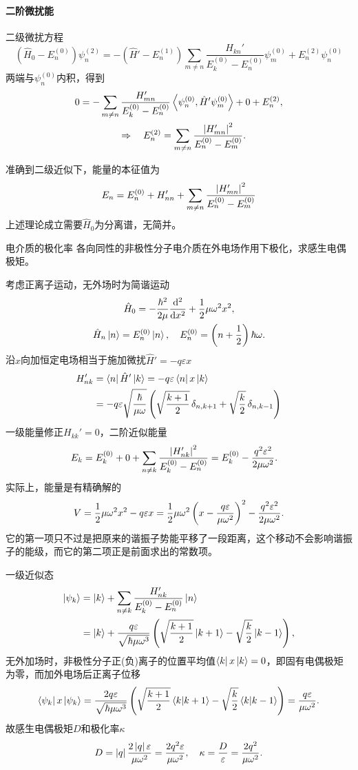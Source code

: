 \paragraph*{二阶微扰能}二级微扰方程
\[(\hat H_0-E_n^{(0)})\psi_n^{(2)}=-(\hat H'-E_n^{(1)})\sum_{m\neq n}\frac{H_{kn}'}{E_k^{(0)}-E_n^{(0)}}\psi_m^{(0)}+E_n^{(2)}\psi_n^{(0)}\]
两端与$\psi_n^{(0)}$内积，得到
\begin{gather}\notag
	0=-\sum_{m\neq n}\frac{H_{mn}'}{E_k^{(0)}-E_n^{(0)}}\inp{\psi_n^{(0)}}{\hat H'\psi_m^{(0)}}+0+E_n^{(2)},\\
	\thus E_n^{(2)}=\sum_{m\neq n}\frac{\abs{H_{mn}'}^2}{E_n^{(0)}-E_m^{(0)}}.
\end{gather}

准确到二级近似下，能量的本征值为
\begin{align}
	E_n=E_n^{(0)}+H_{nn}'+\sum_{m\neq n}\frac{\abs{H_{mn}'}^2}{E_n^{(0)}-E_m^{(0)}}
\end{align}
上述理论成立需要$\hat H_0$为分离谱，无简并。
\begin{example}{电介质的极化率}{}
	各向同性的非极性分子电介质在外电场作用下极化，求感生电偶极矩。

	考虑正离子运动，无外场时为简谐运动
	\begin{gather*}
		\hat H_0=-\frac{\hbar^2}{2\mu}\dd[2]x+\frac12\mu\omega^2x^2,\\
		\hat H_n\ket n=E_n^{(0)}\ket n,\quad E_n^{(0)}=\kh{n+\frac12}\hbar\omega.
	\end{gather*}
	沿$x$向加恒定电场相当于施加微扰$\hat H'=-q\varepsilon x$
	\begin{align*}
		H_{nk}'&=\bra n\hat H'\ket k=-q\varepsilon\bra nx\ket k\\
		&=-q\varepsilon\sqrt{\frac\hbar{\mu\omega}}\kh{\sqrt{\frac{k+1}2}\vd_{n,k+1}+\sqrt{\frac k2}\vd_{n,k-1}}
	\end{align*}
	一级能量修正$H_{kk}'=0$，二阶近似能量
	\begin{align*}
		E_k&=E_k^{(0)}+0+\sum_{n\neq k}\frac{\abs{H_{nk}'}^2}{E_k^{(0)}-E_n^{(0)}}=E_k^{(0)}-\frac{q^2\varepsilon^2}{2\mu\omega^2}.
	\end{align*}
	实际上，能量是有精确解的
	\[V=\frac12\mu\omega^2x^2-q\varepsilon x=\frac12\mu\omega^2\kh{x-\frac{q\varepsilon}{\mu\omega^2}}^2-\frac{q^2\varepsilon^2}{2\mu\omega^2}.\]
	它的第一项只不过是把原来的谐振子势能平移了一段距离，这个移动不会影响谐振子的能级，而它的第二项正是前面求出的常数项。

	一级近似态
	\begin{align*}
		\ket{\psi_k}&=\ket k+\sum_{n\neq k}\frac{H_{nk}'}{E_k^{(0)}-E_n^{(0)}}\ket n\\
		&=\ket k+\frac{q\varepsilon}{\sqrt{\hbar\mu\omega^3}}\kh{\sqrt{\frac{k+1}2}\ket{k+1}-\sqrt{\frac k2}\ket{k-1}},
	\end{align*}
	无外加场时，非极性分子正(负)离子的位置平均值$\bra kx\ket k=0$，即固有电偶极矩为零，而加外电场后正离子位移
	\[\bra{\psi_k}x\ket{\psi_k}=\frac{2q\varepsilon}{\sqrt{\hbar\mu\omega^3}}\kh{\sqrt{\frac{k+1}2}\brkt k{k+1}-\sqrt{\frac k2}\brkt k{k-1}}=\frac{q\varepsilon}{\mu\omega^2}.\]
	故感生电偶极矩$D$和极化率$\kappa$
	\[D=\abs q\frac{2\abs q\varepsilon}{\mu\omega^2}=\frac{2q^2\varepsilon}{\mu\omega^2},\quad \kappa=\frac D\varepsilon=\frac{2q^2}{\mu\omega^2}.\]
\end{example}
